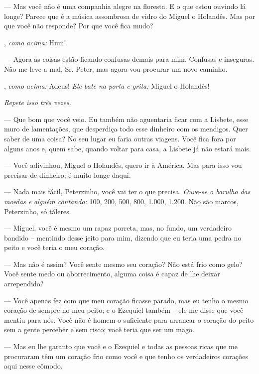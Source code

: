 \begin{myparindent}{0pt}
\begin{Parskip}
 --- Mas você não é uma companhia alegre na floresta. E o que
estou ouvindo lá longe? Parece que é a música assombrosa de vidro do
Miguel o Holandês. Mas por que você não responde? Por que você fica
mudo?

, \emph{como acima:} Hum!

 --- Agora as coisas estão ficando confusas demais para mim.
Confusas e inseguras. Não me leve a mal, Sr. Peter, mas agora vou
procurar um novo caminho.

, \emph{como acima:} Adeus! \emph{Ele bate na porta
e grita:} Miguel o Holandês!

\emph{Repete isso três vezes.}

 --- Que bom que você veio. Eu também não aguentaria
ficar com a Lisbete, esse muro de lamentações, que desperdiça todo esse
dinheiro com os mendigos. Quer saber de uma coisa? No seu lugar eu faria
outras viagens. Você fica fora por alguns anos e, quem sabe, quando
voltar para casa, a Lisbete já não estará mais.

 --- Você adivinhou, Miguel o Holandês, quero ir à
América. Mas para isso vou precisar de dinheiro; é muito longe daqui.

 --- Nada mais fácil, Peterzinho, você vai ter o que
precisa. \emph{Ouve-se o barulho das moedas e alguém contando:} 100,
200, 500, 800, 1.000, 1.200. Não são marcos, Peterzinho, só táleres.

 --- Miguel, você é mesmo um rapaz porreta, mas, no
fundo, um verdadeiro bandido -- mentindo desse jeito para mim, dizendo
que eu teria uma pedra no peito e você teria o meu coração.

 --- Mas não é assim? Você sente mesmo seu coração? Não
está frio como gelo? Você sente medo ou aborrecimento, alguma coisa é
capaz de lhe deixar arrependido?

 --- Você apenas fez com que meu coração ficasse
parado, mas eu tenho o mesmo coração de sempre no meu peito; e o
Ezequiel também -- ele me disse que você mentiu para nós. Você não é
homem o suficiente para arrancar o coração do peito sem a gente perceber
e sem risco; você teria que ser um mago.

 --- Mas eu lhe garanto que você e o Ezequiel e todas as
pessoas ricas que me procuraram têm um coração frio como você e que
tenho os verdadeiros corações aqui nesse cômodo.


\end{Parskip}
\end{myparindent}
